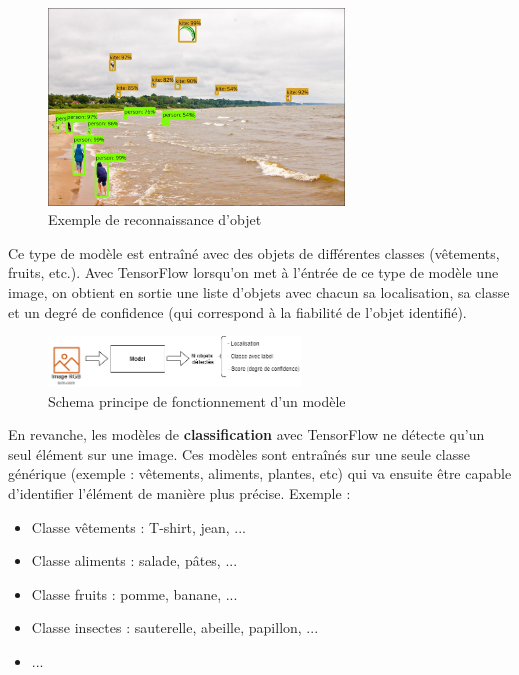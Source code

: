 \documentclass[UTF8]{EPURapport}
\begin{document}
\begin{figure}[h!]
\centering
  \includegraphics[width=0.7\textwidth]{images/object_detection.jpg}
  \caption{Exemple de reconnaissance d'objet}
  \label{fig:objectdetection}
\end{figure}

 Ce type de modèle est entraîné avec des objets de différentes classes (vêtements, fruits, etc.). Avec TensorFlow lorsqu'on met à l'éntrée de ce type de modèle une image, on obtient en sortie une liste d'objets avec chacun sa localisation, sa classe et un degré de confidence (qui correspond à la fiabilité de l'objet identifié).

\newpage
\begin{figure}[h!]
\centering
  \includegraphics[width=0.6\textwidth]{images/schema_objectDetection.png}
  \caption{Schema principe de fonctionnement d'un modèle}
  \label{fig:schema_objectdetection}
\end{figure}

En revanche, les modèles de \textbf{classification} avec TensorFlow ne détecte qu'un seul élément sur une image. Ces modèles sont entraînés sur une seule classe générique (exemple : vêtements, aliments, plantes, etc) qui va ensuite être capable d'identifier l'élément de manière plus précise. Exemple : \\

\begin{itemize}
  \item Classe vêtements : T-shirt, jean, ...
  \item Classe aliments : salade, pâtes, ...
  \item Classe fruits : pomme, banane, ...  
  \item Classe insectes : sauterelle, abeille, papillon, ...
  \item  ...
\end{itemize}
\end{document}
